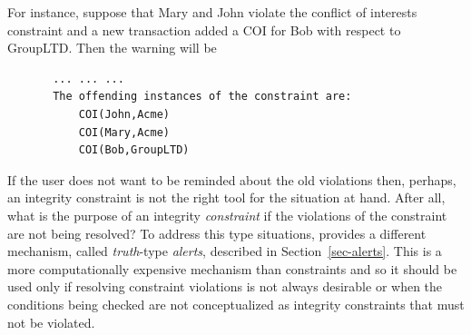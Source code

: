 For instance, suppose that Mary and John violate the conflict of interests
constraint and a new transaction added a COI for Bob with respect to
GroupLTD. Then the warning will be
\begin{verbatim}
       ... ... ...
       The offending instances of the constraint are:
           COI(John,Acme)
           COI(Mary,Acme)
           COI(Bob,GroupLTD)
\end{verbatim}
If the user does not want to be reminded about the old violations then,
perhaps, an integrity constraint is not the right tool for the situation at
hand. After all, what is the purpose of an integrity \emph{constraint} if
the violations of the constraint are not being resolved?
To address this type situations, \ERGO provides a different mechanism,
called \emph{truth}-type \emph{alerts}, described in Section~\ref{sec-alerts}.
This is a more computationally expensive mechanism than constraints and so
it should be used only if resolving constraint violations is not always
desirable or when the conditions being checked are not conceptualized as
integrity constraints that must not be violated.


